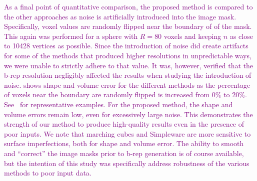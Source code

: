 \textcolor{purple}{As a final point of quantitative comparison, the proposed method is compared to the other approaches as noise is artificially introduced into the image mask. Specifically, voxel values are randomly flipped near the boundary of of the mask. This again was performed for a sphere with $R = 80$ voxels and keeping $n$ as close to 10428 vertices as possible. Since the introduction of noise did create artifacts for some of the methods that produced higher resolutions in unpredictable ways, we were unable to strictly adhere to that value. It was, however, verified that the b-rep resolution negligibly affected the results when studying the introduction of noise.  shows shape and volume error for the different methods as the percentage of voxels near the boundary are randomly flipped is increased from $0\%$ to $20\%$. See~ for representative examples. For the proposed method, the shape and volume errors remain low, even for excessively large noise. This demonstrates the strength of our method to produce high-quality results even in the presence of poor inputs. We note that marching cubes and Simpleware are more sensitive to surface imperfections, both for shape and volume error. The ability to smooth and ``correct'' the image masks prior to b-rep generation is of course available, but the intention of this study was specifically address robustness of the various methods to poor input data.}
